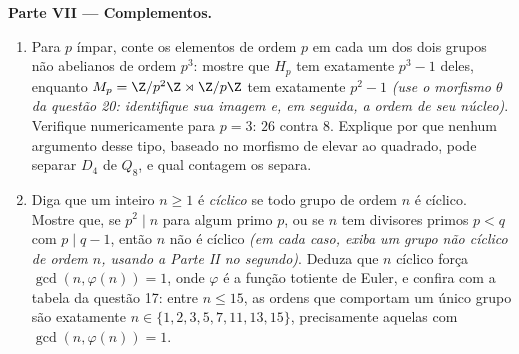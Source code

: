 \begin{problem}
\medskip
\noindent\textbf{Parte VII --- Complementos.}
\begin{enumerate}[resume]
  \item Para $p$ ímpar, conte os elementos de ordem $p$ em
        cada um dos dois grupos não abelianos de ordem $p^3$:
        mostre que $H_p$ tem exatamente $p^3 - 1$ deles, enquanto
        $M_p =
        \Z/p^2\Z \rtimes \Z/p\Z$ tem exatamente $p^2 - 1$ \emph{(use o morfismo
        $\theta$ da questão 20: identifique sua imagem e, em
        seguida, a ordem de seu núcleo)}. Verifique numericamente para
        $p = 3$: $26$ contra $8$. Explique por que
        nenhum argumento desse tipo, baseado no morfismo de elevar ao
        quadrado, pode separar $D_4$ de $Q_8$, e qual
        contagem os separa.
  \item Diga que um inteiro $n \geq 1$ é \emph{cíclico} se todo grupo de
        ordem $n$ é cíclico. Mostre que, se $p^2 \mid n$ para algum
        primo $p$, ou se $n$ tem divisores primos $p < q$
        com $p \mid q - 1$, então $n$ não é cíclico \emph{(em cada caso,
        exiba um grupo não cíclico de ordem $n$, usando a Parte II
        no segundo)}. Deduza que $n$ cíclico força $\gcd(n, \varphi(n)) = 1$, onde
        $\varphi$ é a função totiente de Euler, e confira com a tabela da
        questão 17: entre $n \leq 15$, as ordens que comportam um único
        grupo são exatamente $n \in \{1, 2, 3, 5, 7, 11, 13, 15\}$, precisamente aquelas com $\gcd(n, \varphi(n)) = 1$.
\end{enumerate}
\end{problem}

